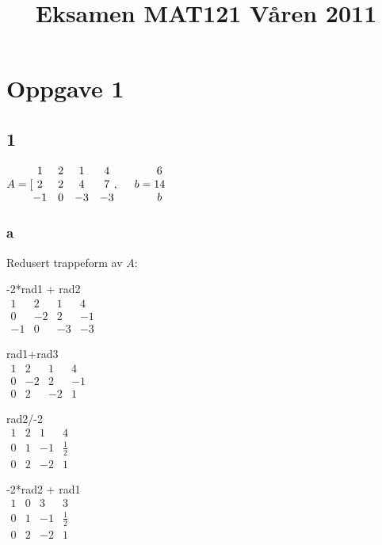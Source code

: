 \documentclass{article}
\begin{document}
\title{Eksamen MAT121 Våren 2011}

\maketitle

\section*{Oppgave 1}

\subsection*{1}

$A=[
\begin{matrix}
    1 & 2 & 1 & 4\\
    2 & 2 & 4 & 7\\
    -1 & 0 & -3 & -3
\end{matrix}
, \hspace{5 mm}
b=
\begin{matrix}
    6\\
    14\\
    b
\end{matrix}
$

\subsubsection*{a}
Redusert trappeform av $A$:

-2*rad1 + rad2\\
$
\begin{matrix}
    1 & 2 & 1 & 4\\
    0 & -2 & 2 & -1\\
    -1 & 0 & -3 & -3
\end{matrix}
$

rad1+rad3\\
$
\begin{matrix}
    1 & 2 & 1 & 4\\
    0 & -2 & 2 & -1\\
    0 & 2 & -2 & 1
\end{matrix}
$

rad2/-2\\
$
\begin{matrix}
    1 & 2 & 1 & 4\\
    0 & 1 & -1 & \frac{1}{2}\\
    0 & 2 & -2 & 1
\end{matrix}
$

-2*rad2 + rad1\\
$
\begin{matrix}
    1 & 0 & 3 & 3\\
    0 & 1 & -1 & \frac{1}{2}\\
    0 & 2 & -2 & 1
\end{matrix}
$
\end{document}
